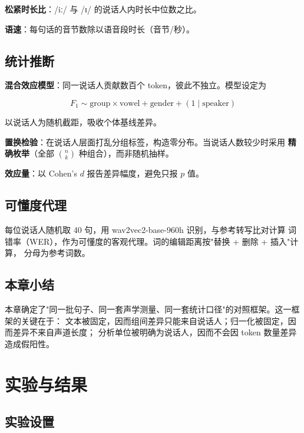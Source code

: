 \documentclass[12pt,a4paper,fontset=fandol]{ctexrep}
\newcommand{\ipa}[1]{/#1/}
\begin{document}
\textbf{松紧时长比}：\ipa{iː} 与 \ipa{ɪ} 的说话人内时长中位数之比。

\textbf{语速}：每句话的音节数除以语音段时长（音节/秒）。

\section{统计推断}

\textbf{混合效应模型}：同一说话人贡献数百个 token，彼此不独立。模型设定为

\begin{equation}
F_1 \sim \text{group} \times \text{vowel} + \text{gender} + (1 \mid \text{speaker})
\end{equation}

以说话人为随机截距，吸收个体基线差异。

\textbf{置换检验}：在说话人层面打乱分组标签，构造零分布。当说话人数较少时采用
\textbf{精确枚举}（全部 $\binom{n}{k}$ 种组合），而非随机抽样。

\textbf{效应量}：以 Cohen's $d$ 报告差异幅度，避免只报 $p$ 值。

\section{可懂度代理}

每位说话人随机取 40 句，用 wav2vec2-base-960h\cite{wav2vec2} 识别，与参考转写比对计算
词错率（WER），作为可懂度的客观代理。词的编辑距离按"替换 + 删除 + 插入"计算，
分母为参考词数。

\section{本章小结}

本章确定了"同一批句子、同一套声学测量、同一套统计口径"的对照框架。这一框架的关键在于：
文本被固定，因而组间差异只能来自说话人；归一化被固定，因而差异不来自声道长度；
分析单位被明确为说话人，因而不会因 token 数量差异造成假阳性。

\chapter{实验与结果}\label{ch:result}

\section{实验设置}
\end{document}
